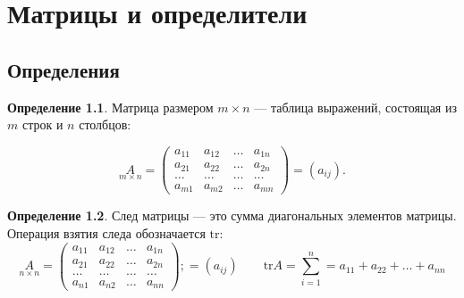 \documentclass[a4paper,12pt]{extbook}
\author{Daniil Shvalov}
\date{\today}
\title{}
\theoremstyle{definition}
\newtheorem{definition}{Определение}[section]
\begin{document}
\tableofcontents


\hypersetup{linktoc = all, colorlinks = true, urlcolor = DodgerBlue4, citecolor = PaleGreen1, linkcolor = blue}

\makeatletter
\def\thm@space@setup{\thm@preskip=1pt
    \thm@postskip=1pt}
\makeatother

\def\lets{%
    \mathord{\setbox0=\hbox{$\exists$}%
        \hbox{\kern 0.125\wd0%
            \vbox to \ht0{%
                \hrule width 0.75\wd0%
                \vfill%
                \hrule width 0.75\wd0}%
            \vrule height \ht0%
            \kern 0.125\wd0}%
    }%
}


\chapter{Матрицы и определители}
\label{sec:org37c4e21}
\section{Определения}
\label{sec:orgc3e0aac}
\begin{definition}
    Матрица размером \(m \times n\) — таблица выражений, состоящая из \(m\) строк и \(n\) столбцов:

    \begin{equation*}
        \underset{m \times n}{A} =
        \begin{pmatrix}
            a_{11} & a_{12} & \ldots & a_{1n} \\
            a_{21} & a_{22} & \ldots & a_{2n} \\
            \ldots & \ldots & \ldots & \ldots \\
            a_{m1} & a_{m2} & \ldots & a_{mn}
        \end{pmatrix}
        = (a_{ij}).
    \end{equation*}
\end{definition}

\begin{definition}
    След матрицы — это сумма диагональных элементов матрицы. Операция взятия следа обозначается \(\mathrm{tr}\):
    \begin{equation*}
        \underset{n \times n}{A} =
        \begin{pmatrix}
            a_{11} & a_{12} & \ldots & a_{1n} \\
            a_{21} & a_{22} & \ldots & a_{2n} \\
            \ldots & \ldots & \ldots & \ldots \\
            a_{n1} & a_{n2} & \ldots & a_{nn}
        \end{pmatrix};
        = (a_{ij})
        \qquad
        \mathrm{tr} A = \sum_{i = 1}^n = a_{11} + a_{22} + \ldots + a_{nn}
    \end{equation*}
\end{definition}
\end{document}
